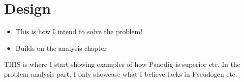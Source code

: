 \chapter{Design}
\begin{itemize}
    \item This is how I intend to solve the problem! %
    \item Builds on the analysis chapter
\end{itemize}

THIS is where I start showing examples of how Psnodig is superior etc. In the problem analysis part, I only showcase what I believe lacks in Pseudogen etc.